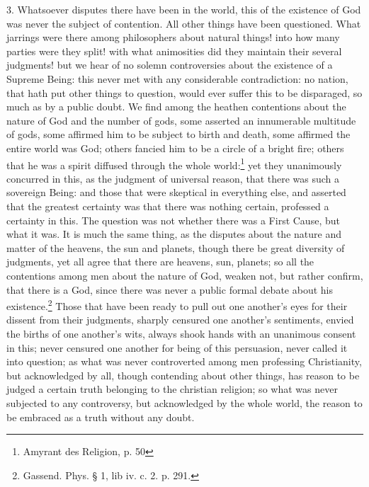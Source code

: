 \documentclass[a5paper]{book}
\begin{document}
3. Whatsoever disputes there have been in the world,
    this of the existence of God was never the subject of contention. 
All other things have been questioned.  %
What jarrings were there among philosophers about natural things! 
    into how many parties were they split! 
    with what animosities did they maintain their several judgments! 
    but we hear of no solemn controversies about the existence of a Supreme Being: 
    this never met with any considerable contradiction: 
    no nation, that hath put other things to question, 
    would ever suffer this to be disparaged, 
    so much as by a public doubt. 
We find among the heathen contentions about the nature of God 
    and the number of gods, 
    some asserted an innumerable multitude of gods,
    some affirmed him to be subject to birth and death, 
    some affirmed the entire world was God; 
    others fancied him to be a circle of a bright fire; 
    others that he was a spirit diffused through the whole world:\footnote{Amyrant des Religion, p. 50}
    yet they unanimously concurred in this, 
    as the judgment of universal reason, 
    that there was such a sovereign Being: 
    and those that were skeptical in everything else, 
    and asserted that the greatest certainty was that there was nothing certain, 
    professed a certainty in this. 
The question was not whether there was a First Cause, 
    but what it was. 
It is much the same thing, 
    as the disputes about the nature and matter of the heavens, 
    the sun and planets, 
    though there be great diversity of judgments, 
    yet all agree that there are heavens, sun, planets; 
    so all the contentions among men about the nature of God,
    weaken not, but rather confirm, that there is a God, 
    since there was never a public formal debate about his existence.\footnote{Gassend. Phys. § 1, lib iv. c. 2. p. 291.}
Those that have been ready to pull out one another’s eyes 
    for their dissent from their judgments, 
    sharply censured one another’s sentiments, 
    envied the births of one another’s wits, 
    always shook hands with an unanimous consent in this; 
    never censured one another for being of this persuasion, 
    never called it into question; 
    as what was never controverted among men professing Christianity, 
    but acknowledged by all, 
    though contending about other things, 
    has reason to be judged a certain truth belonging to the christian religion; 
    so what was never subjected to any controversy, 
    but acknowledged by the whole world, 
    the reason to be embraced as a truth without any doubt.
\end{document}
